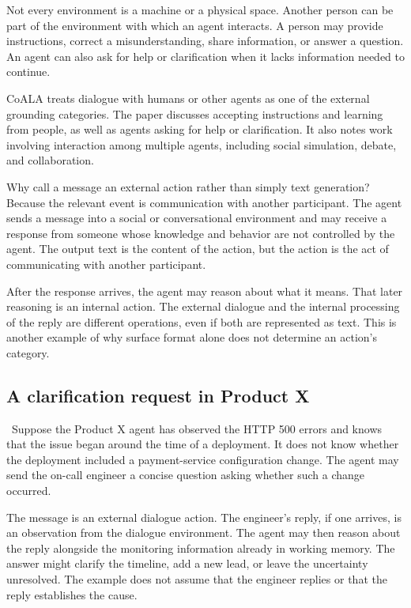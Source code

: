 Not every environment is a machine or a physical space. Another person can be part of the environment with which an agent interacts. A person may provide instructions, correct a misunderstanding, share information, or answer a question. An agent can also ask for help or clarification when it lacks information needed to continue.

CoALA treats dialogue with humans or other agents as one of the external grounding categories. The paper discusses accepting instructions and learning from people, as well as agents asking for help or clarification. It also notes work involving interaction among multiple agents, including social simulation, debate, and collaboration.

Why call a message an external action rather than simply text generation? Because the relevant event is communication with another participant. The agent sends a message into a social or conversational environment and may receive a response from someone whose knowledge and behavior are not controlled by the agent. The output text is the content of the action, but the action is the act of communicating with another participant.

After the response arrives, the agent may reason about what it means. That later reasoning is an internal action. The external dialogue and the internal processing of the reply are different operations, even if both are represented as text. This is another example of why surface format alone does not determine an action's category.

\subsection{A clarification request in Product X}

\BookExampleLabel\ Suppose the Product X agent has observed the HTTP 500 errors and knows that the issue began around the time of a deployment. It does not know whether the deployment included a payment-service configuration change. The agent may send the on-call engineer a concise question asking whether such a change occurred.

The message is an external dialogue action. The engineer's reply, if one arrives, is an observation from the dialogue environment. The agent may then reason about the reply alongside the monitoring information already in working memory. The answer might clarify the timeline, add a new lead, or leave the uncertainty unresolved. The example does not assume that the engineer replies or that the reply establishes the cause.

